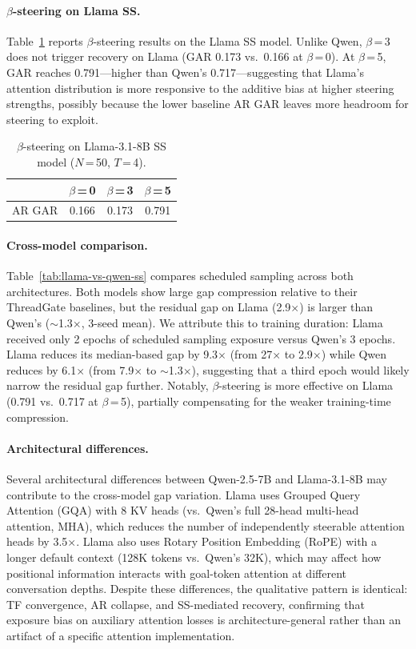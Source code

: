 \paragraph{$\beta$-steering on Llama SS.}
Table~\ref{tab:llama-ss-steering} reports $\beta$-steering results on the Llama SS model. Unlike Qwen, $\beta$\,=\,3 does not trigger recovery on Llama (GAR 0.173 vs.\ 0.166 at $\beta$\,=\,0). At $\beta$\,=\,5, GAR reaches 0.791---higher than Qwen's 0.717---suggesting that Llama's attention distribution is more responsive to the additive bias at higher steering strengths, possibly because the lower baseline AR GAR leaves more headroom for steering to exploit.

\begin{table}[t]
\centering\small
\caption{$\beta$-steering on Llama-3.1-8B SS model ($N$\,=\,50, $T$\,=\,4).}
\label{tab:llama-ss-steering}
\begin{tabular}{@{}l ccc@{}}
\toprule
& $\beta$\,=\,0 & $\beta$\,=\,3 & $\beta$\,=\,5 \\
\midrule
AR GAR & 0.166 & 0.173 & 0.791 \\
\bottomrule
\end{tabular}
\end{table}

\paragraph{Cross-model comparison.}
Table~\ref{tab:llama-vs-qwen-ss} compares scheduled sampling across both architectures. Both models show large gap compression relative to their ThreadGate baselines, but the residual gap on Llama (2.9$\times$) is larger than Qwen's (${\sim}$1.3$\times$, 3-seed mean). We attribute this to training duration: Llama received only 2 epochs of scheduled sampling exposure versus Qwen's 3 epochs. Llama reduces its median-based gap by 9.3$\times$ (from 27$\times$ to 2.9$\times$) while Qwen reduces by 6.1$\times$ (from 7.9$\times$ to ${\sim}$1.3$\times$), suggesting that a third epoch would likely narrow the residual gap further. Notably, $\beta$-steering is more effective on Llama (0.791 vs.\ 0.717 at $\beta$\,=\,5), partially compensating for the weaker training-time compression.

\paragraph{Architectural differences.}
Several architectural differences between Qwen-2.5-7B and Llama-3.1-8B may contribute to the cross-model gap variation. Llama uses Grouped Query Attention (GQA) with 8 KV heads (vs.\ Qwen's full 28-head multi-head attention, MHA), which reduces the number of independently steerable attention heads by 3.5$\times$. Llama also uses Rotary Position Embedding (RoPE) with a longer default context (128K tokens vs.\ Qwen's 32K), which may affect how positional information interacts with goal-token attention at different conversation depths. Despite these differences, the qualitative pattern is identical: TF convergence, AR collapse, and SS-mediated recovery, confirming that exposure bias on auxiliary attention losses is architecture-general rather than an artifact of a specific attention implementation.

